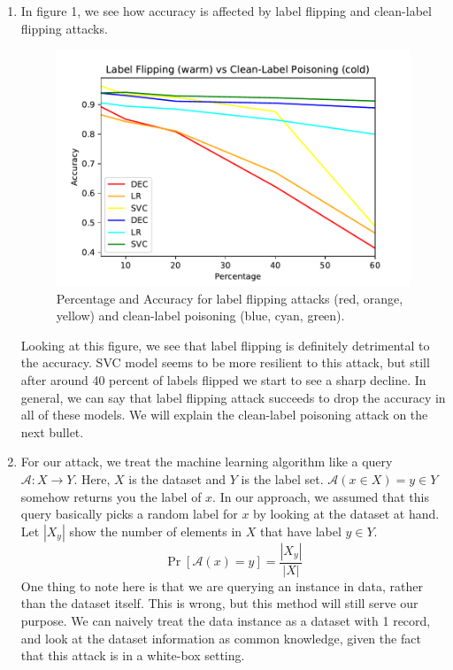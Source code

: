 \documentclass[12pt,reqno]{amsart}
\newcommand{\advrs}[0]{\mathcal{A}}
\begin{document}
\begin{enumerate}[label=(\alph*)]
\item In figure 1, we see how accuracy is affected by label flipping and clean-label flipping attacks. 
\begin{figure}[ht]
 	\label{fig:lblflip}
 	\includegraphics[width=0.8\linewidth]{labelflip.pdf}
 	\caption{Percentage and Accuracy for label flipping attacks (red, orange, yellow) and clean-label poisoning (blue, cyan, green).}
\end{figure}
Looking at this figure, we see that label flipping is definitely detrimental to the accuracy. SVC model seems to be more resilient to this attack, but still after around 40 percent of labels flipped we start to see a sharp decline. In general, we can say that label flipping attack succeeds to drop the accuracy in all of these models. We will explain the clean-label poisoning attack on the next bullet.

\item For our attack, we treat the machine learning algorithm like a query $\advrs : X \to Y$. Here, $X$ is the dataset and $Y$ is the label set. $\advrs (x \in X) = y \in Y$ somehow returns you the label of $x$. In our approach, we assumed that this query basically picks a random label for $x$ by looking at the dataset at hand. Let $|X_y|$ show the number of elements in $X$ that have label $y \in Y$.
$$
\Pr[\advrs(x) = y] = \frac{|X_y|}{|X|}
$$
One thing to note here is that we are querying an instance in data, rather than the dataset itself. This is wrong, but this method will still serve our purpose. We can naively treat the data instance as a dataset with 1 record, and look at the dataset information as common knowledge, given the fact that this attack is in a white-box setting. 


\end{enumerate}
\end{document}

